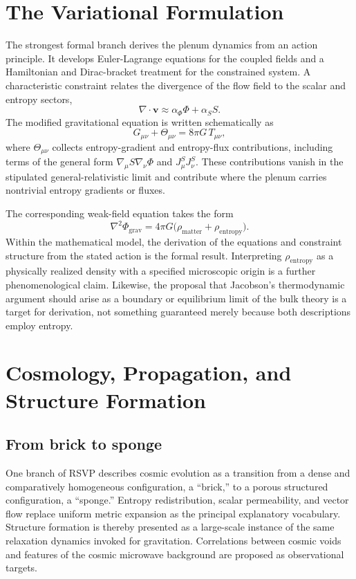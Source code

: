 \documentclass[11pt]{article}
\begin{document}
\section{The Variational Formulation}
\label{sec:variational}

The strongest formal branch derives the plenum dynamics from an action principle. It develops Euler-Lagrange equations for the coupled fields and a Hamiltonian and Dirac-bracket treatment for the constrained system. A characteristic constraint relates the divergence of the flow field to the scalar and entropy sectors,
\[
\nabla\cdot\mathbf{v}\approx\alpha_\Phi\Phi+\alpha_S S.
\]
The modified gravitational equation is written schematically as
\[
G_{\mu\nu}+\Theta_{\mu\nu}=8\pi G\,T_{\mu\nu},
\]
where $\Theta_{\mu\nu}$ collects entropy-gradient and entropy-flux contributions, including terms of the general form $\nabla_\mu S\nabla_\nu\Phi$ and $J^S_\mu J^S_\nu$. These contributions vanish in the stipulated general-relativistic limit and contribute where the plenum carries nontrivial entropy gradients or fluxes.

The corresponding weak-field equation takes the form
\[
\nabla^2\Phi_{\mathrm{grav}}
=4\pi G\bigl(\rho_{\mathrm{matter}}+\rho_{\mathrm{entropy}}\bigr).
\]
Within the mathematical model, the derivation of the equations and constraint structure from the stated action is the formal result. Interpreting $\rho_{\mathrm{entropy}}$ as a physically realized density with a specified microscopic origin is a further phenomenological claim. Likewise, the proposal that Jacobson's thermodynamic argument should arise as a boundary or equilibrium limit of the bulk theory is a target for derivation, not something guaranteed merely because both descriptions employ entropy.

\section{Cosmology, Propagation, and Structure Formation}
\label{sec:cosmology}

\subsection{From brick to sponge}

One branch of RSVP describes cosmic evolution as a transition from a dense and comparatively homogeneous configuration, a ``brick,'' to a porous structured configuration, a ``sponge.'' Entropy redistribution, scalar permeability, and vector flow replace uniform metric expansion as the principal explanatory vocabulary. Structure formation is thereby presented as a large-scale instance of the same relaxation dynamics invoked for gravitation. Correlations between cosmic voids and features of the cosmic microwave background are proposed as observational targets.
\end{document}
